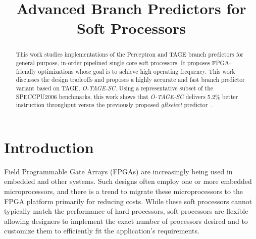 \documentclass[conference]{IEEEtran}
\begin{document}
\title{Advanced Branch Predictors for Soft Processors}


\author{
}

\maketitle


\begin{abstract}
This work studies implementations of the Perceptron \cite{perceptron} and TAGE \cite{tage} branch predictors for general purpose, in-order pipelined single core soft processors. It proposes FPGA-friendly optimizations whose goal is to achieve high operating frequency. This work discusses the design tradeoffs and proposes a highly accurate and fast branch predictor variant based on TAGE, \textit{O-TAGE-SC}. Using a representative subset of the SPECCPU2006 benchmarks, this work shows that \textit{O-TAGE-SC} delivers 5.2\% better instruction throughput versus the previously proposed \textit{gRselect} predictor~\cite{grselect}.
\end{abstract}


\IEEEpeerreviewmaketitle


\section{Introduction}
\label{sec:intro}
Field Programmable Gate Arrays (FPGAs) are increasingly being used in embedded and other systems. Such designs often employ one or more embedded microprocessors, and there is a trend to migrate these microprocessors to the FPGA platform primarily for reducing costs. While these soft processors cannot typically match the performance of hard processors, soft processors are flexible allowing designers to implement the exact number of processors desired and to customize them to efficiently fit the application's requirements.
\end{document}
